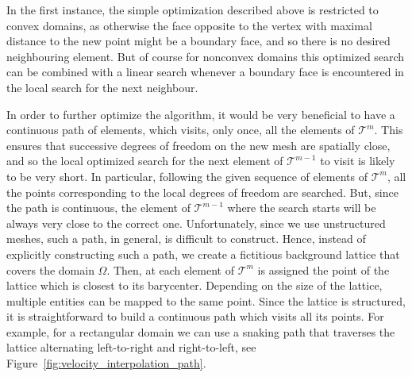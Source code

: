 \documentclass[a4paper,12pt,onecolumn]{article}
\begin{document}
In the first instance, the simple optimization described above is restricted to
convex domains, as otherwise the face opposite to the vertex with maximal
distance to the new point might be a boundary face, and so there is no desired
neighbouring element. But of course for nonconvex domains this optimized search
can be combined with a linear search whenever a boundary face is encountered in
the local search for the next neighbour.

In order to further optimize the algorithm, it would be very beneficial to have
a continuous path of elements, which visits, only once, all the elements of
$\mathcal{T}^m$. This ensures that successive degrees of freedom on the new
mesh are spatially close, and so the local optimized search for the next
element of $\mathcal{T}^{m-1}$ to visit is likely to be very short. In
particular, following the given sequence of elements of $\mathcal{T}^m$,
all the points corresponding to the local degrees of freedom are searched.
But, since the path is continuous, the element of $\mathcal{T}^{m-1}$ where the
search starts will be always very close to the correct one. Unfortunately,
since we use unstructured meshes, such a path, in general, is difficult to
construct. Hence, instead of explicitly constructing such a path, we create a
fictitious background lattice that covers the domain $\Omega$. Then, at each
element of $\mathcal{T}^m$ is assigned the point of the lattice which is
closest to its barycenter. Depending on the size of the lattice, multiple
entities can be mapped to the same point. Since the lattice is structured, it
is straightforward to build a continuous path which visits all its points. For
example, for a rectangular domain we can use a snaking path that traverses the
lattice alternating left-to-right and right-to-left, see
Figure~\ref{fig:velocity_interpolation_path}.
\end{document}
